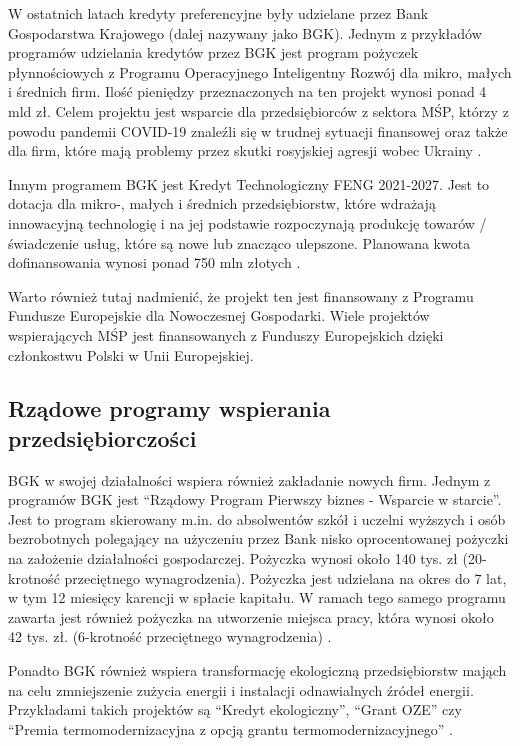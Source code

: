 \documentclass[11pt]{article}
\begin{document}
\medskip

W ostatnich latach kredyty preferencyjne były udzielane przez Bank Gospodarstwa Krajowego (dalej nazywany jako BGK).
Jednym z przykładów programów udzielania kredytów przez BGK jest program pożyczek płynnościowych z 
Programu Operacyjnego Inteligentny Rozwój dla mikro, małych i średnich firm.
Ilość pieniędzy przeznaczonych na ten projekt wynosi ponad 4 mld zł. Celem projektu jest wsparcie dla przedsiębiorców z sektora MŚP, 
którzy z powodu pandemii COVID-19 znaleźli się w trudnej sytuacji finansowej oraz także dla firm, które mają problemy przez skutki
rosyjskiej agresji wobec Ukrainy \cite{BgkProgramPlynnosci}.

Innym programem BGK jest Kredyt Technologiczny FENG 2021-2027. Jest to dotacja dla mikro-, małych i średnich przedsiębiorstw, 
które wdrażają innowacyjną technologię i na jej podstawie rozpoczynają produkcję towarów / świadczenie usług, które są nowe lub znacząco ulepszone.
Planowana kwota dofinansowania wynosi ponad 750 mln złotych \cite{KredytTechnologicznyFENG}.

Warto również tutaj nadmienić, że projekt ten jest finansowany z Programu Fundusze Europejskie dla Nowoczesnej Gospodarki.
Wiele projektów wspierających MŚP jest finansowanych z Funduszy Europejskich dzięki członkostwu Polski w Unii Europejskiej.

\subsection*{Rządowe programy wspierania przedsiębiorczości}

BGK w swojej działalności wspiera również zakładanie nowych firm. Jednym z programów BGK jest ``Rządowy Program Pierwszy biznes - Wsparcie w starcie''.
Jest to program skierowany m.in. do absolwentów szkół i uczelni wyższych i osób bezrobotnych polegający na użyczeniu przez Bank nisko oprocentowanej
pożyczki na założenie działalności gospodarczej. Pożyczka wynosi około 140 tys. zł (20-krotność przeciętnego wynagrodzenia). Pożyczka jest udzielana na okres do 7 lat,
 w tym 12 miesięcy karencji w spłacie kapitału. W ramach tego samego programu zawarta jest również pożyczka na utworzenie miejsca pracy, która wynosi około 42 tys. zł.
(6-krotność przeciętnego wynagrodzenia) \cite{BgkProgramStart}.

Ponadto BGK również wspiera transformację ekologiczną przedsiębiorstw mająch na celu zmniejszenie zużycia energii i instalacji odnawialnych źródeł energii.
Przykładami takich projektów są ``Kredyt ekologiczny'', ``Grant OZE'' czy ``Premia termomodernizacyjna z opcją grantu termomodernizacyjnego'' \cite{BgkProgramEkologia}.
\end{document}
